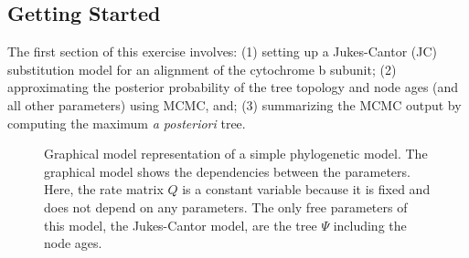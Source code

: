\bigskip
\subsection{Getting Started}

The first section of this exercise involves:
(1) setting up a Jukes-Cantor (JC) substitution model for an alignment of the cytochrome b subunit;
(2) approximating the posterior probability of the tree topology and node ages (and all other parameters) using MCMC, and; 
(3) summarizing the MCMC output by computing the maximum \textit{a posteriori} tree. 

\begin{figure}[h!]
\centering
{}
\caption{\small Graphical model representation of a simple phylogenetic model. 
The graphical model shows the dependencies between the parameters.
Here, the rate matrix $Q$ is a constant variable because it is fixed and does not depend on any parameters.
The only free parameters of this model, the Jukes-Cantor model, are the tree $\Psi$ including the node ages.}
\label{fig:jc0}
\end{figure}

